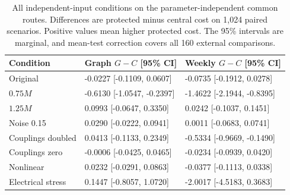\documentclass[journal]{IEEEtran}
\newcommand{\DIFnewtablecolor}{\color{blue}}
\begin{document}
\begin{table}[t]\DIFnewtablecolor
\centering
\caption{All independent-input conditions on the parameter-independent common routes. Differences are protected minus central cost on 1,024 paired scenarios. Positive values mean higher protected cost. The 95\% intervals are marginal, and mean-test correction covers all 160 external comparisons.}
\label{tab:guarded-external-independent}
\footnotesize\setlength{\tabcolsep}{3pt}\renewcommand{\arraystretch}{1.12}
\begin{tabular}{@{}p{}p{}p{}@{}}
\toprule
Condition & Graph $G-C$ [95\% CI] & Weekly $G-C$ [95\% CI] \\
\midrule
Original & -0.0227 [-0.1109, 0.0607] & -0.0735 [-0.1912, 0.0278] \\
$0.75M$ & -0.6130 [-1.0547, -0.2397] & -1.4622 [-2.1944, -0.8395] \\
$1.25M$ & 0.0993 [-0.0647, 0.3350] & 0.0242 [-0.1037, 0.1451] \\
Noise 0.15 & 0.0290 [-0.0222, 0.0941] & 0.0011 [-0.0683, 0.0741] \\
Couplings doubled & 0.0413 [-0.1133, 0.2349] & -0.5334 [-0.9669, -0.1490] \\
Couplings zero & -0.0006 [-0.0425, 0.0465] & -0.0234 [-0.0939, 0.0420] \\
Nonlinear & 0.0232 [-0.0291, 0.0863] & -0.0377 [-0.1113, 0.0338] \\
Electrical stress & 0.1447 [-0.8057, 1.0720] & -2.0017 [-4.5183, 0.3683] \\
\bottomrule
\end{tabular}
\end{table}
\end{document}
